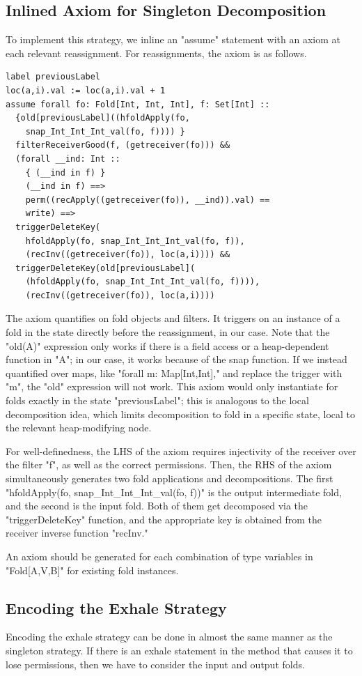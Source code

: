 \documentclass[msc,oneside]{ubcthesis}
\theoremstyle{definition}
\begin{document}
\subsection{Inlined Axiom for Singleton Decomposition}
To implement this strategy, we inline an "assume" statement with an axiom at each relevant reassignment. For reassignments, the axiom is as follows. 
\begin{lstlisting}[label=inlSingleton,caption=Singleton Decomposition Axiom]
label previousLabel
loc(a,i).val := loc(a,i).val + 1
assume forall fo: Fold[Int, Int, Int], f: Set[Int] ::
  {old[previousLabel]((hfoldApply(fo, 
    snap_Int_Int_Int_val(fo, f)))) }
  filterReceiverGood(f, (getreceiver(fo))) &&
  (forall __ind: Int ::
    { (__ind in f) }
    (__ind in f) ==>
    perm((recApply((getreceiver(fo)), __ind)).val) ==
    write) ==>
  triggerDeleteKey(
    hfoldApply(fo, snap_Int_Int_Int_val(fo, f)),
    (recInv((getreceiver(fo)), loc(a,i)))) &&
  triggerDeleteKey(old[previousLabel](
    (hfoldApply(fo, snap_Int_Int_Int_val(fo, f)))), 
    (recInv((getreceiver(fo)), loc(a,i))))
\end{lstlisting}
The axiom quantifies on fold objects and filters. It triggers on an instance of a fold in the state directly before the reassignment, in our case. Note that the "old(A)" expression only works if there is a field access or a heap-dependent function in "A"; in our case, it works because of the snap function. If we instead quantified over maps, like "forall m: Map[Int,Int]," and replace the trigger with "m", the "old" expression will not work. This axiom would only instantiate for folds exactly in the state "previousLabel"; this is analogous to the local decomposition idea, which limits decomposition to fold in a specific state, local to the relevant heap-modifying node. 

For well-definedness, the LHS of the axiom requires injectivity of the receiver over the filter "f", as well as the correct permissions. Then, the RHS of the axiom simultaneously generates two fold applications and decompositions. The first "hfoldApply(fo, snap_Int_Int_Int_val(fo, f))" is the output intermediate fold, and the second is the input fold. Both of them get decomposed via the "triggerDeleteKey" function, and the appropriate key is obtained from the receiver inverse function "recInv."

An axiom should be generated for each combination of type variables in "Fold[A,V,B]" for existing fold instances.


\subsection{Encoding the Exhale Strategy}
Encoding the exhale strategy can be done in almost the same manner as the singleton strategy. If there is an exhale statement in the method that causes it to lose permissions, then we have to consider the input and output folds.
\end{document}
